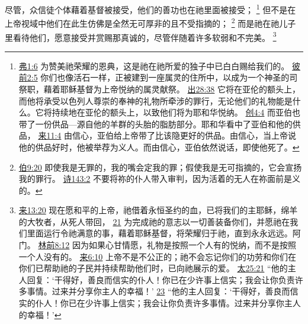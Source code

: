 \documentclass[12pt, a4paper, oneside]{ctexart}
\newcounter{parnum}[section]
\newcommand{\N}{%
   \noindent\refstepcounter{parnum}%
    \makebox[\parindent][l]{\textbf{\arabic{parnum}.}}}
\begin{document}
\N 尽管，众信徒个体藉着基督被接受，他们的善功也在祂里面被接受；
	\footnote {
		\href{https://biblehub.com/ephesians/1-6.htm}{弗1:6} 为赞美祂荣耀的恩典，这是祂在祂所爱的独子中已白白赐给我们的。
		\href{https://biblehub.com/1_peter/2-5.htm}{彼前2:5} 你们也像活石一样，正被建到一座属灵的住所中，以成为一个神圣的司祭职，藉着耶稣基督为上帝悦纳的属灵献祭。
		\href{https://biblehub.com/exodus/28-38.htm}{出28:38} 它将在亚伦的额头上，而他将承受以色列人尊崇的奉神的礼物所牵涉的罪行，无论他们的礼物能是什么。它将持续地在亚伦的额头上，以致他们将为耶和华悦纳。
		\href{https://biblehub.com/genesis/4-4.htm}{创4:4} 而亚伯也带了一份供品---源自他的羊群的头胎的脂肪部分。耶和华看中了亚伯和他的供品，
		\href{https://biblehub.com/hebrews/11-4.htm}{来11:4} 由信心，亚伯给上帝带了比该隐更好的供品。由信心，当上帝说他的供品好时，他被举荐为义人。而由信心，亚伯依然说话，即使他死了。
	}
	但不是在上帝视域中他们在此生仿佛是全然无可厚非的且不受指摘的；
	\footnote {
		\href{https://biblehub.com/job/9-20.htm}{伯9:20} 即使我是无罪的，我的嘴会定我的罪；假使我是无可指摘的，它会宣扬我的罪行。
		\href{https://biblehub.com/psalms/143-2.htm}{诗143:2} 不要将祢的仆人带入审判，因为活着的无人在祢面前是义的。
	}
	而是祂在祂儿子里看待他们，愿意接受并赏赐那真诚的，尽管伴随着许多软弱和不完美。
	\footnote {
		\href{https://biblehub.com/hebrews/13-20.htm}{来13:20} 现在愿和平的上帝，祂借着永恒圣约的血，已将我们的主耶稣，绵羊的大牧者，从死人带回，
		\href{https://biblehub.com/hebrews/13-21.htm}{21} 为完成祂的意志以一切善装备你们，并愿祂在我们里面运行令祂满意的事，藉着耶稣基督，将荣耀归于祂，直到永永远远。阿门。
		\href{https://biblehub.com/2_corinthians/8-12.htm}{林前8:12} 因为如果心甘情愿，礼物是按照一个人有的悦纳，而不是按照一个人没有的。
		\href{https://biblehub.com/hebrews/6-10.htm}{来6:10} 上帝不是不公正的；祂不会忘记你们的功劳和你们在你们已帮助祂的子民并持续帮助他们时，已向祂展示的爱。
		\href{https://biblehub.com/matthew/25-21.htm}{太25:21} “他的主人回复：‘干得好，善良而信实的仆人！你已在少许事上信实；我会让你负责许多事情。过来并分享你主人的幸福！’
		\href{https://biblehub.com/matthew/25-23.htm}{23} “他的主人回复：‘干得好，善良而信实的仆人！你已在少许事上信实；我会让你负责许多事情。过来并分享你主人的幸福！’
	}
\end{document}
